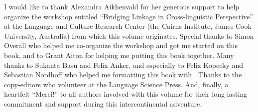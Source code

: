 \begin{refsection}

I would like to thank Alexandra Aikhenvald for her generous support to help organize the workshop entitled ``Bridging Linkage in Cross-linguistic Perspective'' at the Language and Culture Research Center (the Cairns Institute, James Cook University, Australia) from which this volume originates. Special thanks to Simon Overall who helped me co-organize the workshop and got me started on this book, and to Grant Aiton for helping me putting this book together. Many thanks to Sukanta Basu and Felix Anker, and especially to Felix Kopecky and Sebastian Nordhoff who helped me formatting this book with \XeLaTeX. Thanks to the  copy-editors who volunteer at the Language Science Press. And, finally, a heartfelt ``Merci!'' to all authors involved with this volume for their long-lasting commitment and support during this intercontinental adventure.

\printbibliography[heading=subbibliography]
\end{refsection}
